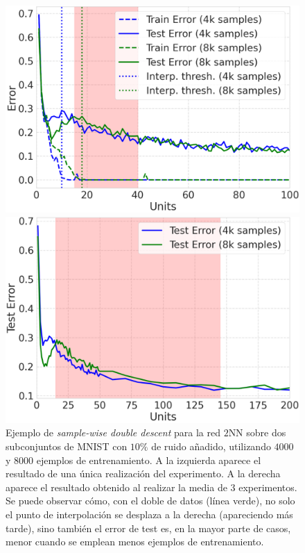\begin{figure}[h!]
    \centering
    \begin{minipage}{0.49\textwidth}
        \centering
        \includegraphics[width=\linewidth]{img/experiments/sample-wise-dd1.png}
    \end{minipage}
    \hfill
    \begin{minipage}{0.49\textwidth}
        \centering
        \includegraphics[width=\linewidth]{img/experiments/sample-wise-dd2.png}
    \end{minipage}
    \caption[Ejemplo de \textit{sample-wise double descent}.]{Ejemplo de \textit{sample-wise double descent} para la red $2$NN sobre dos subconjuntos de MNIST con $10\%$ de ruido añadido, utilizando $4000$ y $8000$ ejemplos de entrenamiento. A la izquierda aparece el resultado de una única realización del experimento. A la derecha aparece el resultado obtenido al realizar la media de $3$ experimentos. Se puede observar cómo, con el doble de datos (línea verde), no solo el punto de interpolación se desplaza a la derecha (apareciendo más tarde), sino también el error de test es, en la mayor parte de casos, menor cuando se emplean menos ejemplos de entrenamiento.}\label{fig:swdd}
\end{figure}

